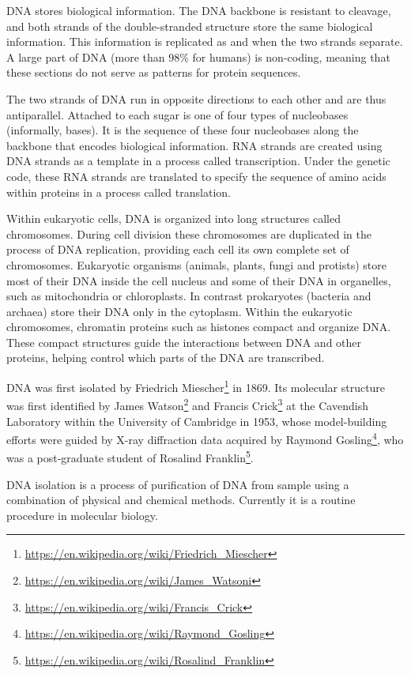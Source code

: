 \documentclass[]{book}
\let\rmarkdownfootnote\footnote%
\def\footnote{\protect\rmarkdownfootnote}
\renewcommand{\href}[2]{#2\footnote{\url{#1}}}
\begin{document}
DNA stores biological information. The DNA backbone is resistant to cleavage, and both strands of the double-stranded structure store the same biological information. This information is replicated as and when the two strands separate. A large part of DNA (more than 98\% for humans) is non-coding, meaning that these sections do not serve as patterns for protein sequences.

The two strands of DNA run in opposite directions to each other and are thus antiparallel. Attached to each sugar is one of four types of nucleobases (informally, bases). It is the sequence of these four nucleobases along the backbone that encodes biological information. RNA strands are created using DNA strands as a template in a process called transcription. Under the genetic code, these RNA strands are translated to specify the sequence of amino acids within proteins in a process called translation.

Within eukaryotic cells, DNA is organized into long structures called chromosomes. During cell division these chromosomes are duplicated in the process of DNA replication, providing each cell its own complete set of chromosomes. Eukaryotic organisms (animals, plants, fungi and protists) store most of their DNA inside the cell nucleus and some of their DNA in organelles, such as mitochondria or chloroplasts. In contrast prokaryotes (bacteria and archaea) store their DNA only in the cytoplasm. Within the eukaryotic chromosomes, chromatin proteins such as histones compact and organize DNA. These compact structures guide the interactions between DNA and other proteins, helping control which parts of the DNA are transcribed.

DNA was first isolated by \href{https://en.wikipedia.org/wiki/Friedrich_Miescher}{Friedrich Miescher} in 1869. Its molecular structure was first identified by \href{https://en.wikipedia.org/wiki/James_Watsoni}{James Watson} and \href{https://en.wikipedia.org/wiki/Francis_Crick}{Francis Crick} at the Cavendish Laboratory within the University of Cambridge in 1953, whose model-building efforts were guided by X-ray diffraction data acquired by \href{https://en.wikipedia.org/wiki/Raymond_Gosling}{Raymond Gosling}, who was a post-graduate student of \href{https://en.wikipedia.org/wiki/Rosalind_Franklin}{Rosalind Franklin}.

DNA isolation is a process of purification of DNA from sample using a combination of physical and chemical methods. Currently it is a routine procedure in molecular biology.
\end{document}
